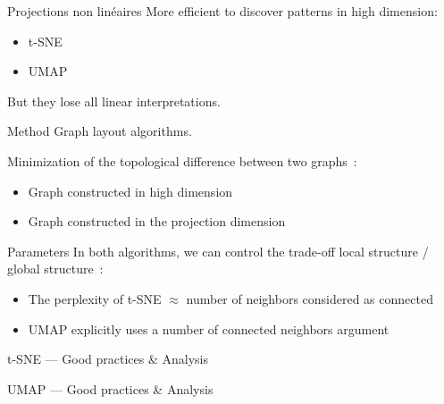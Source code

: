 \begin{frame}{Projections non linéaires}
  More efficient to discover patterns in high dimension:

  \begin{itemize}
    \item t-SNE
    \item UMAP
  \end{itemize}
\end{frame}

But they lose all linear interpretations.

\begin{frame}{Method}
  Graph layout algorithms.

  Minimization of the topological difference between two graphs~:

  \begin{itemize}
    \item Graph constructed in high dimension
    \item Graph constructed in the projection dimension
  \end{itemize}
\end{frame}

\begin{frame}{Parameters}
  In both algorithms, we can control the trade-off local structure / global structure~:

  \begin{itemize}
    \item The perplexity of t-SNE $\approx$ number of neighbors considered as connected
    \item UMAP explicitly uses a number of connected neighbors argument
  \end{itemize}
\end{frame}

\begin{frame}{t-SNE --- Good practices \& Analysis}
\end{frame}

\begin{frame}{UMAP --- Good practices \& Analysis}
\end{frame}
